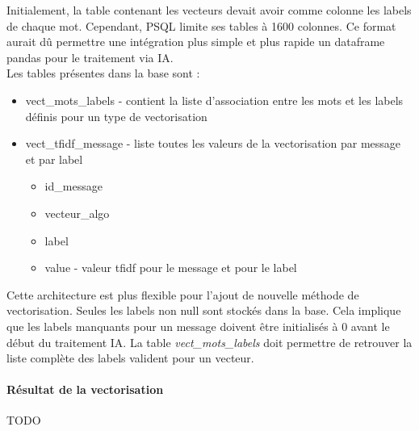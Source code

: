             Initialement, la table contenant les vecteurs devait avoir comme colonne les labels de chaque mot.
            Cependant, PSQL limite ses tables à 1600 colonnes.
            Ce format aurait dû permettre une intégration plus simple et plus rapide un dataframe pandas pour le traitement via IA\@.\\
            Les tables présentes dans la base sont :
            \begin{itemize}
                \item vect\_mots\_labels - contient la liste d'association entre les mots et les labels définis pour un type de vectorisation
                \item vect\_tfidf\_message - liste toutes les valeurs de la vectorisation par message et par label
                \begin{itemize}
                    \item id\_message
                    \item vecteur\_algo
                    \item label
                    \item value - valeur tfidf pour le message et pour le label
                \end{itemize}
            \end{itemize}
            Cette architecture est plus flexible pour l'ajout de nouvelle méthode de vectorisation.
            Seules les labels non null sont stockés dans la base.
            Cela implique que les labels manquants pour un message doivent être initialisés à 0 avant le début du traitement IA\@.
            La table \emph{vect\_mots\_labels} doit permettre de retrouver la liste complète des labels valident pour un vecteur.

        \paragraph{Résultat de la vectorisation}
            TODO